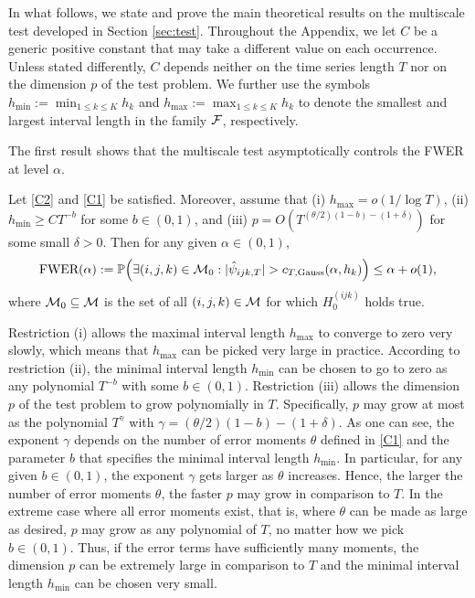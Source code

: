 \documentclass[a4paper,12pt]{article}
\numberwithin{equation}{section}
\begin{document}
\enlargethispage{0.1cm}


In what follows, we state and prove the main theoretical results on the multiscale test developed in Section \ref{sec:test}. Throughout the Appendix, we let $C$ be a generic positive constant that may take a different value on each occurrence. Unless stated differently, $C$ depends neither on the time series length $T$ nor on the dimension $p$ of the test problem. We further use the symbols $h_{\min}:= \min_{1 \le k \le K} h_k$ and $h_{\max} := \max_{1 \le k \le K} h_k$ to denote the smallest and largest interval length in the family $\mathcal{F}$, {\color{red} respectively.} 


{\color{red} The first result shows that the multiscale test asymptotically controls the FWER at level $\alpha$.}
\begin{theoremA}\label{theo1}
Let \ref{C2} and \ref{C1} be satisfied. Moreover, assume that (i) $h_{\max} = o(1/\log T)$, (ii) $h_{\min} \ge CT^{-b}$ for some $b \in (0,1)$, and (iii) $p = O(T^{(\theta/2)(1-b)-(1+\delta)})$ for some small $\delta > 0$. Then for any given $\alpha \in (0,1)$,
\[ \textnormal{FWER}(\alpha) := \mathbb{P} \Big( \exists (i,j,k) \in \mathcal{M}_0: |\hat{\psi}_{ijk,T}| > c_{T,\textnormal{Gauss}}(\alpha,h_k) \Big) \le \alpha + o(1), \]
where $\mathcal{M}_0 \subseteq \mathcal{M}$ is the set of all $(i,j,k) \in \mathcal{M}$ for which $H_0^{(ijk)}$ holds true. 
\end{theoremA}
Restriction (i) allows the maximal interval length $h_{\max}$ to converge to zero very slowly, which means that $h_{\max}$ can be picked very large in practice. According to restriction (ii), the minimal interval length $h_{\min}$ can be chosen to go to zero as any polynomial $T^{-b}$ with some $b \in (0,1)$. Restriction (iii) allows the dimension $p$ of the test problem to grow polynomially in $T$. Specifically, $p$ may grow at most as the polynomial $T^{\gamma}$ with $\gamma = (\theta/2)(1-b)-(1+\delta)$. As one can see, the exponent $\gamma$ depends on the number of error moments $\theta$ defined in \ref{C1} and the parameter $b$ that specifies the minimal interval length $h_{\min}$. In particular, for any given $b \in (0,1)$, the exponent $\gamma$ gets larger as $\theta$ increases. Hence, the larger the number of error moments $\theta$, the faster $p$ may grow in comparison to $T$. In the extreme case where all error moments exist, that is, where $\theta$ can be made as large as desired, $p$ may grow as any polynomial of $T$, no matter how we pick $b \in (0,1)$. Thus, if the error terms have sufficiently many moments, the dimension $p$ can be extremely large in comparison to $T$ and the minimal interval length $h_{\min}$ can be chosen very small. 
\end{document}
